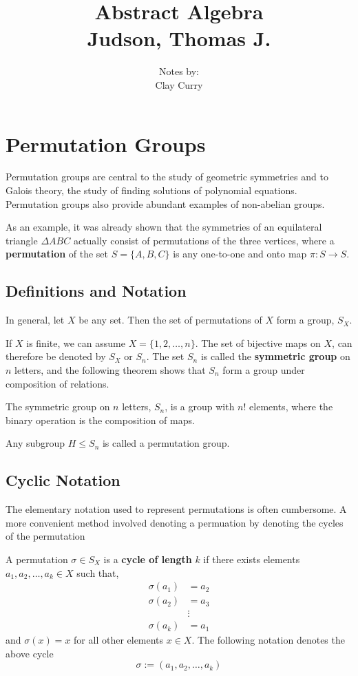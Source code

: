 \documentclass[11pt]{article} %
\title{Abstract Algebra \\ Judson, Thomas J.}
\author{Notes by:  \\ Clay Curry}
\date{}
\newcommand\set[1]{\{#1\}}
\begin{document}
\maketitle
\setcounter{section}{4}
\section{Permutation Groups}

Permutation groups are central to the study of geometric symmetries and to Galois theory, the study of finding solutions of polynomial equations. Permutation groups also provide abundant examples of non-abelian groups.

As an example, it was already shown that the symmetries of an equilateral triangle $\Delta ABC$ actually consist of permutations of the three vertices, where a \textbf{permutation} of the set $S = \set{A,B,C}$ is any one-to-one and onto map $\pi : S \to S$.

\subsection{Definitions and Notation}

In general, let $X$ be any set. Then the set of permutations of $X$ form a group, $S_X$.

{If $X$ is finite, we can assume $X = \set{1, 2, \ldots, n}$. The set of bijective maps on $X$, can therefore be denoted by $S_X$ or $S_n$. The set $S_n$ is called the \textbf{symmetric group} on $n$ letters, and the following theorem shows that $S_n$ form a group under composition of relations.}

{The symmetric group on $n$ letters, $S_n$, is a group with $n!$ elements, where the binary operation is the composition of maps.}{}

{Any subgroup $H \leqslant S_n$ is called a permutation group.}

\newpage
\subsection{Cyclic Notation}

The elementary notation used to represent permutations is often cumbersome. A more convenient method involved denoting a permuation by denoting the cycles of the permutation

{A permutation $\sigma \in S_X$ is a \textbf{cycle of length} $k$ if there exists elements $a_1, a_2, \ldots, a_k \in X$ such that,
\begin{align*}
\sigma(a_1) &= a_2\\
\sigma(a_2) &= a_3\\
&\vdots\\
\sigma(a_k) &= a_1
\end{align*}
and $\sigma(x) = x$ for all other elements $x \in X$. The following notation denotes the above cycle 
$$\sigma := (a_1, a_2, \ldots, a_k)$$
}
\end{document}
